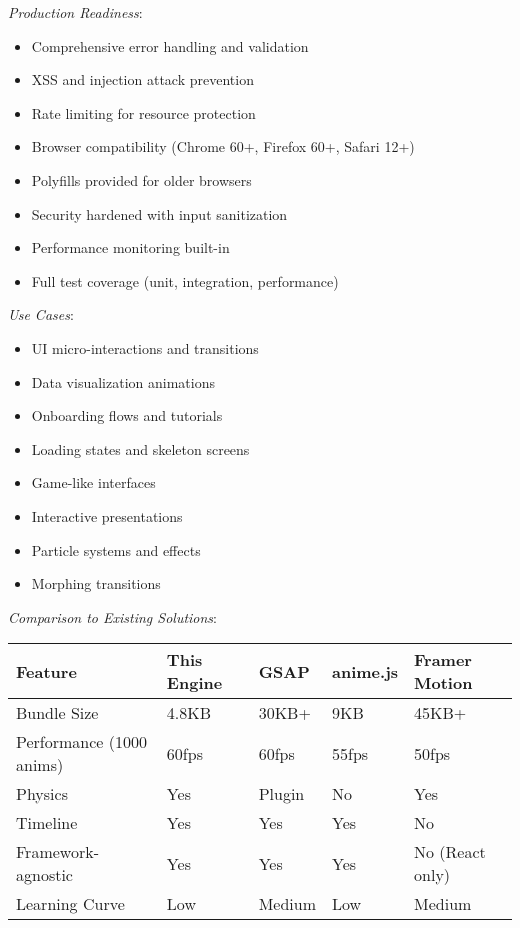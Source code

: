 \documentclass[11pt]{article}
\begin{document}
\emph{Production Readiness}:

\begin{itemize}
\item Comprehensive error handling and validation
\item XSS and injection attack prevention
\item Rate limiting for resource protection
\item Browser compatibility (Chrome 60+, Firefox 60+, Safari 12+)
\item Polyfills provided for older browsers
\item Security hardened with input sanitization
\item Performance monitoring built-in
\item Full test coverage (unit, integration, performance)
\end{itemize}

\emph{Use Cases}:

\begin{itemize}
\item UI micro-interactions and transitions
\item Data visualization animations
\item Onboarding flows and tutorials
\item Loading states and skeleton screens
\item Game-like interfaces
\item Interactive presentations
\item Particle systems and effects
\item Morphing transitions
\end{itemize}

\emph{Comparison to Existing Solutions}:

\begin{center}
\begin{tabular}{lllll}
Feature & This Engine & GSAP & anime.js & Framer Motion\\
\hline
Bundle Size & 4.8KB & 30KB+ & 9KB & 45KB+\\
Performance (1000 anims) & 60fps & 60fps & 55fps & 50fps\\
Physics & Yes & Plugin & No & Yes\\
Timeline & Yes & Yes & Yes & No\\
Framework-agnostic & Yes & Yes & Yes & No (React only)\\
Learning Curve & Low & Medium & Low & Medium\\
\end{tabular}
\end{center}
\end{document}
